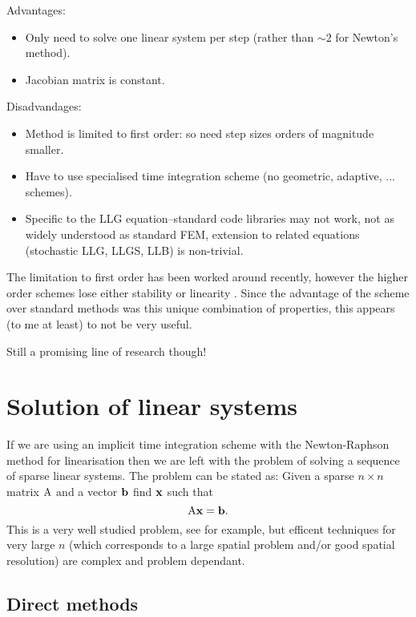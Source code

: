 Advantages:
\begin{itemize}
\item Only need to solve one linear system per step (rather than $\sim 2$ for Newton's method).
\item Jacobian matrix is constant.
\end{itemize}

Disadvandages:
\begin{itemize}
\item Method is limited to first order: so need step sizes orders of magnitude smaller.
\item Have to use specialised time integration scheme (no geometric, adaptive, ... schemes).
\item Specific to the LLG equation--standard code libraries may not work, not as widely understood as standard FEM, extension to related equations (stochastic LLG, LLGS, LLB) is non-trivial.
\end{itemize}

The limitation to first order has been worked around recently, however the higher order schemes lose either stability or linearity \cite{Kritsikis2014}.
Since the advantage of the scheme over standard methods was this unique combination of properties, this appears (to me at least) to not be very useful.

Still a promising line of research though!


\section{Solution of linear systems}
\label{sec:solution-lin-sys}

If we are using an implicit time integration scheme with the Newton-Raphson method for linearisation then we are left with the problem of solving a sequence of sparse linear systems.
The problem can be stated as: Given a sparse $n \times n $ matrix $\mathrm{A}$ and a vector ${\mathbf{b}}$ find $\mathbf{x}$ such that
\begin{equation}
  \label{eq:linear-system}
  \mathrm{A} \mathbf{x} = {\mathbf{b}}.
\end{equation}
This is a very well studied problem, see for example\cite{Saad2000}, but efficent techniques for very large $n$ (which corresponds to a large spatial problem and/or good spatial resolution) are complex and problem dependant.


\subsection{Direct methods}
\label{sec:direct-methods}

